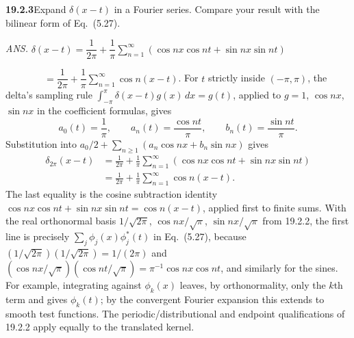 \par\bigskip
\noindent\textbf{19.2.3}\quad Expand $\delta(x-t)$ in a Fourier
series. Compare your result with the bilinear form of Eq.~(5.27).
\par\nobreak\hfill\emph{ANS.}\enspace
$\delta(x-t)=\dfrac{1}{2\pi}+\dfrac{1}{\pi}
\displaystyle\sum_{n=1}^{\infty}(\cos nx\cos nt+\sin nx\sin nt)$\par
\nobreak\hfill$\hspace{4em}=\dfrac{1}{2\pi}+\dfrac{1}{\pi}
\displaystyle\sum_{n=1}^{\infty}\cos n(x-t)$.
\solution
For $t$ strictly inside $(-\pi,\pi)$, the delta's sampling rule
$\int_{-\pi}^{\pi}\delta(x-t)g(x)\,dx=g(t)$, applied to $g=1$,
$\cos nx$, $\sin nx$ in the coefficient formulas, gives
\[
a_0(t)=\frac1\pi,\qquad
 a_n(t)=\frac{\cos nt}{\pi},\qquad
 b_n(t)=\frac{\sin nt}{\pi}.
\]
Substitution into $a_0/2+\sum_{n\ge1}(a_n\cos nx+b_n\sin nx)$ gives
\begin{align*}
\delta_{2\pi}(x-t)
&=\frac1{2\pi}+\frac1\pi\sum_{n=1}^{\infty}
(\cos nx\cos nt+\sin nx\sin nt)\\
&=\boxed{\frac1{2\pi}+\frac1\pi\sum_{n=1}^{\infty}\cos n(x-t)}.
\end{align*}
The last equality is the cosine subtraction identity
$\cos nx\cos nt+\sin nx\sin nt=\cos n(x-t)$, applied first to finite
sums. With the real orthonormal basis $1/\sqrt{2\pi}$,
$\cos nx/\sqrt\pi$, $\sin nx/\sqrt\pi$ from 19.2.2, the first line is
precisely $\sum_j\phi_j(x)\phi_j^*(t)$ in Eq.~(5.27), because
$(1/\sqrt{2\pi})(1/\sqrt{2\pi})=1/(2\pi)$ and
$(\cos nx/\sqrt\pi)(\cos nt/\sqrt\pi)=\pi^{-1}\cos nx\cos nt$, and
similarly for the sines.
For example, integrating against $\phi_k(x)$ leaves, by orthonormality,
only the $k$th term and gives $\phi_k(t)$; by the convergent Fourier
expansion this extends to smooth test functions.
The periodic/distributional and endpoint qualifications of 19.2.2
apply equally to the translated kernel.

